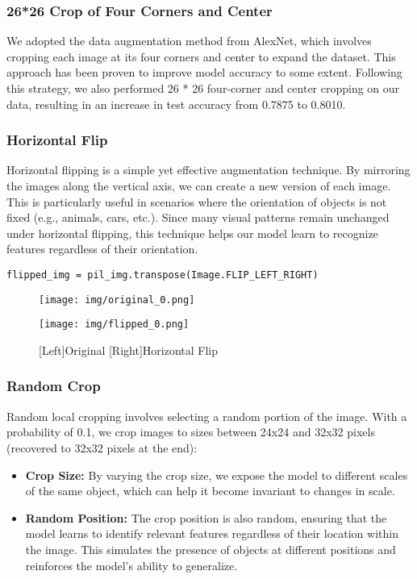 \documentclass[a4paper,11pt]{article}
\begin{document}
\subsubsection{26*26 Crop of Four Corners and Center}
We adopted the data augmentation method from AlexNet, which involves cropping each image at its four corners and center to expand the dataset. This approach has been proven to improve model accuracy to some extent. Following this strategy, we also performed 26 * 26 four-corner and center cropping on our data, resulting in an increase in test accuracy from 0.7875 to 0.8010.

\subsubsection{Horizontal Flip}
Horizontal flipping is a simple yet effective augmentation technique. By mirroring the images along the vertical axis, we can create a new version of each image. This is particularly useful in scenarios where the orientation of objects is not fixed (e.g., animals, cars, etc.). Since many visual patterns remain unchanged under horizontal flipping, this technique helps our model learn to recognize features regardless of their orientation.

\begin{listing}[!ht]
\begin{verbatim}
flipped_img = pil_img.transpose(Image.FLIP_LEFT_RIGHT)
\end{verbatim}
\label{listing:python}
\end{listing}

\begin{figure}[H]
    \centering
    \begin{minipage}{0.49\textwidth}
        \texttt{[image: img/original\_0.png]}
    \end{minipage}
    \hfill
    \begin{minipage}{0.49\textwidth}
        \texttt{[image: img/flipped\_0.png]}
    \end{minipage}
    \caption{[Left]Original [Right]Horizontal Flip}
\end{figure}

\subsubsection{Random Crop}
Random local cropping involves selecting a random portion of the image. With a probability of 0.1, we crop images to sizes between 24x24 and 32x32 pixels (recovered to 32x32 pixels at the end):
\begin{itemize}
    \item \textbf{Crop Size:} By varying the crop size, we expose the model to different scales of the same object, which can help it become invariant to changes in scale.
    \item \textbf{Random Position:} The crop position is also random, ensuring that the model learns to identify relevant features regardless of their location within the image. This simulates the presence of objects at different positions and reinforces the model's ability to generalize.
\end{itemize}
\end{document}

